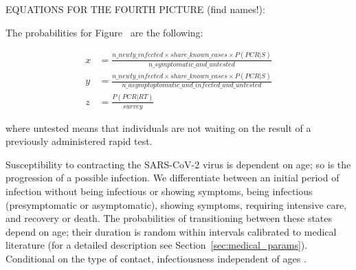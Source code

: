 EQUATIONS FOR THE FOURTH PICTURE (find names!):

The probabilities for Figure~ are the following:

\begin{align*}
    x &= \frac{n\_newly\_infected \times share\_known\_cases \times P(PCR | S)}{n\_symptomatic\_and\_untested} \\
    y &= \frac{n\_newly\_infected \times share\_known\_cases \times P(PCR | S)}{n\_asymptoptomatic\_and\_infected\_and\_untested} \\
    z &= \frac{P(PCR | RT)}{survey}
\end{align*}

where untested means that individuals are not waiting on the result of a previously
administered rapid test.

Susceptibility to contracting the SARS-CoV-2 virus is dependent on age; so is the
progression of a possible infection. We differentiate between an initial period of
infection without being infectious or showing symptoms, being infectious (presymptomatic
or asymptomatic), showing symptoms, requiring intensive care, and recovery or death. The
probabilities of transitioning between these states depend on age; their duration is
random within intervals calibrated to medical literature (for a detailed description see
Section~\ref{sec:medical_params}). Conditional on the type of contact, infectiousness
independent of ages \citep{Jones2021}.

